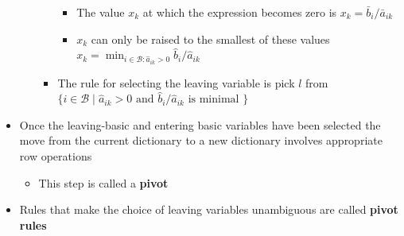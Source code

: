 \documentclass[11pt]{article}
\begin{document}
\begin{itemize}
\begin{itemize}
\begin{itemize}
\begin{itemize}
\item The value \(x_k\) at which the expression becomes zero is \(x_k = \bar b_i / \bar a_{ik}\)
\item \(x_k\) can only be raised to the smallest of these values \(x_k = \min_{i \in \mathcal B : \hat a_{ik} > 0} \hat b_i / \hat a_{ik}\)
\end{itemize}
\item The rule for selecting the leaving variable is pick \(l\) from \(\{i \in \mathcal B \mid \hat a_{ik} > 0 \text{ and } \hat b_i / \hat a_{ik} \text{ is minimal }\}\)
\end{itemize}
\end{itemize}

\item Once the leaving-basic and entering basic variables have been selected the move from the current dictionary to a new dictionary involves appropriate row operations
\begin{itemize}
\item This step is called a \textbf{pivot}
\end{itemize}
\item Rules that make the choice of leaving variables unambiguous are called \textbf{pivot rules}
\end{itemize}
\end{document}
